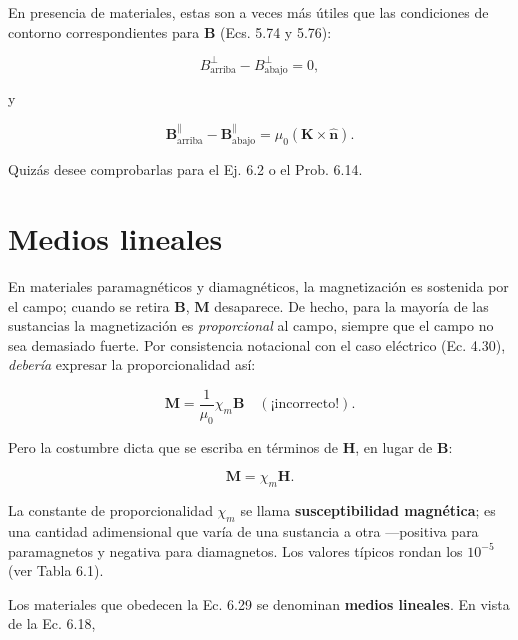 \documentclass[12pt,a4paper]{report}
\newcommand{\esp}{\vspace{0.5cm}}
\begin{document}
	En presencia de materiales, estas son a veces más útiles que las condiciones de contorno correspondientes para $\mathbf{B}$ (Ecs. 5.74 y 5.76):
	
	\begin{equation}
		B_{\text{arriba}}^{\perp} - B_{\text{abajo}}^{\perp} = 0, \tag{6.26}
	\end{equation}
	
	\noindent y
	
	\begin{equation}
		\mathbf{B}_{\text{arriba}}^{\parallel} - \mathbf{B}_{\text{abajo}}^{\parallel} = \mu_0(\mathbf{K} \times \hat{\mathbf{n}}). \tag{6.27}
	\end{equation}
	
	\noindent Quizás desee comprobarlas para el Ej. 6.2 o el Prob. 6.14.
	
	\section{Medios lineales}
	
	En materiales paramagnéticos y diamagnéticos, la magnetización es sostenida por el campo; cuando se retira $\mathbf{B}$, $\mathbf{M}$ desaparece. De hecho, para la mayoría de las sustancias la magnetización es \textit{proporcional} al campo, siempre que el campo no sea demasiado fuerte. Por consistencia notacional con el caso eléctrico (Ec. 4.30), \textit{debería} expresar la proporcionalidad así:
	
	\begin{equation}
		\mathbf{M} = \frac{1}{\mu_0} \chi_m \mathbf{B} \quad (\text{¡incorrecto!}). \tag{6.28}
	\end{equation}
	
	\noindent Pero la costumbre dicta que se escriba en términos de $\mathbf{H}$, en lugar de $\mathbf{B}$:
	
	\begin{equation}
		\boxed{\mathbf{M} = \chi_m \mathbf{H}}. \tag{6.29}
	\end{equation}
	
	La constante de proporcionalidad $\chi_m$ se llama \textbf{susceptibilidad magnética}; es una cantidad adimensional que varía de una sustancia a otra —positiva para paramagnetos y negativa para diamagnetos. Los valores típicos rondan los $10^{-5}$ (ver Tabla 6.1).
	
	\esp
	
	Los materiales que obedecen la Ec. 6.29 se denominan \textbf{medios lineales}. En vista de la Ec. 6.18,
	
\end{document}
